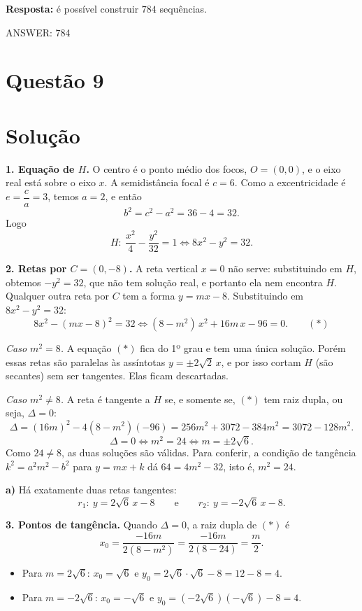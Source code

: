 \documentclass{article}%
\begin{document}
\textbf{Resposta:} é possível construir $784$ sequências.

ANSWER: 784%
\newpage%
\section*{Questão 9}

\section*{Solução}

\textbf{1. Equação de $H$.} O centro é o ponto médio dos focos, $O=(0,0)$, e o eixo real está sobre o eixo $x$. A semidistância focal é $c=6$. Como a excentricidade é $e=\dfrac{c}{a}=3$, temos $a=2$, e então
\[
b^2=c^2-a^2=36-4=32 .
\]
Logo
\[
H:\ \frac{x^2}{4}-\frac{y^2}{32}=1 \iff 8x^2-y^2=32 .
\]

\textbf{2. Retas por $C=(0,-8)$.} A reta vertical $x=0$ não serve: substituindo em $H$, obtemos $-y^2=32$, que não tem solução real, e portanto ela nem encontra $H$. Qualquer outra reta por $C$ tem a forma $y=mx-8$. Substituindo em $8x^2-y^2=32$:
\[
8x^2-(mx-8)^2=32 \iff (8-m^2)\,x^2+16m\,x-96=0. \qquad (\ast)
\]

\emph{Caso $m^2=8$.} A equação $(\ast)$ fica do 1º grau e tem uma única solução. Porém essas retas são paralelas às assíntotas $y=\pm 2\sqrt2\,x$, e por isso cortam $H$ (são secantes) sem ser tangentes. Elas ficam descartadas.

\emph{Caso $m^2\neq 8$.} A reta é tangente a $H$ se, e somente se, $(\ast)$ tem raiz dupla, ou seja, $\Delta=0$:
\[
\Delta=(16m)^2-4(8-m^2)(-96)=256m^2+3072-384m^2=3072-128m^2 .
\]
\[
\Delta=0 \iff m^2=24 \iff m=\pm 2\sqrt6 .
\]
Como $24\neq 8$, as duas soluções são válidas. Para conferir, a condição de tangência $k^2=a^2m^2-b^2$ para $y=mx+k$ dá $64=4m^2-32$, isto é, $m^2=24$.

\textbf{a)} Há exatamente duas retas tangentes:
\[
r_1:\ y=2\sqrt6\,x-8 \qquad\text{e}\qquad r_2:\ y=-2\sqrt6\,x-8 .
\]

\textbf{3. Pontos de tangência.} Quando $\Delta=0$, a raiz dupla de $(\ast)$ é
\[
x_0=\frac{-16m}{2(8-m^2)}=\frac{-16m}{2(8-24)}=\frac{m}{2}.
\]
\begin{itemize}
\item Para $m=2\sqrt6$: $x_0=\sqrt6$ e $y_0=2\sqrt6\cdot\sqrt6-8=12-8=4$.
\item Para $m=-2\sqrt6$: $x_0=-\sqrt6$ e $y_0=(-2\sqrt6)(-\sqrt6)-8=4$.
\end{itemize}
\end{document}

